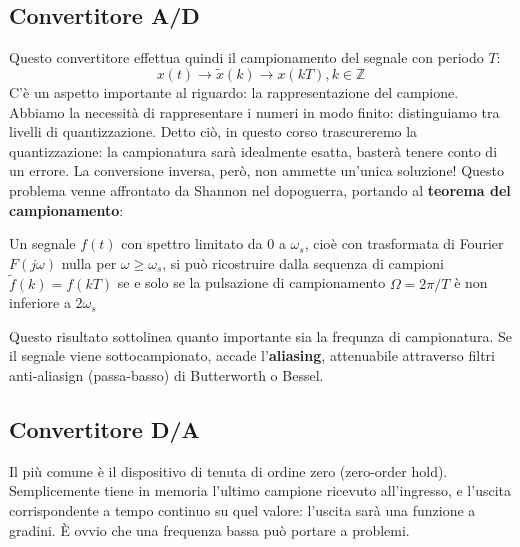 \documentclass[11pt]{article}
\begin{document}
\subsection{Convertitore A/D}
Questo convertitore effettua quindi il campionamento del segnale con periodo $T$:
\begin{displaymath}
    x(t)\rightarrow \widetilde{x}(k)\rightarrow x(kT), k\in \mathbb{Z}
\end{displaymath}
C'è un aspetto importante al riguardo: la rappresentazione del campione. Abbiamo la necessità di rappresentare i numeri in modo finito: distinguiamo tra livelli di quantizzazione. Detto ciò, in questo corso trascureremo la quantizzazione: la campionatura sarà idealmente esatta, basterà tenere conto di un errore.
La conversione inversa, però, non ammette un'unica soluzione! Questo problema venne affrontato da Shannon nel dopoguerra, portando al \textbf{teorema del campionamento}:
\begin{center}
    Un segnale $f(t)$ con spettro limitato da $0$ a $\omega_s$, cioè con trasformata di Fourier $F(j\omega)$ nulla per $\omega\ge\omega_s$, si può ricostruire dalla sequenza di campioni $\widetilde{f}(k)=f(kT)$ se e solo se la pulsazione di campionamento $\Omega = 2\pi /T$ è non inferiore a $2\omega_s$
\end{center}
Questo risultato sottolinea quanto importante sia la frequnza di campionatura.
Se il segnale viene sottocampionato, accade l'\textbf{aliasing}, attenuabile attraverso filtri anti-aliasign (passa-basso) di Butterworth o Bessel.
\subsection{Convertitore D/A}
Il più comune è il dispositivo di tenuta di ordine zero (zero-order hold). Semplicemente tiene in memoria l'ultimo campione ricevuto all'ingresso, e l'uscita corrispondente a tempo continuo su quel valore: l'uscita sarà una funzione a gradini.
È ovvio che una frequenza bassa può portare a problemi.
\end{document}
